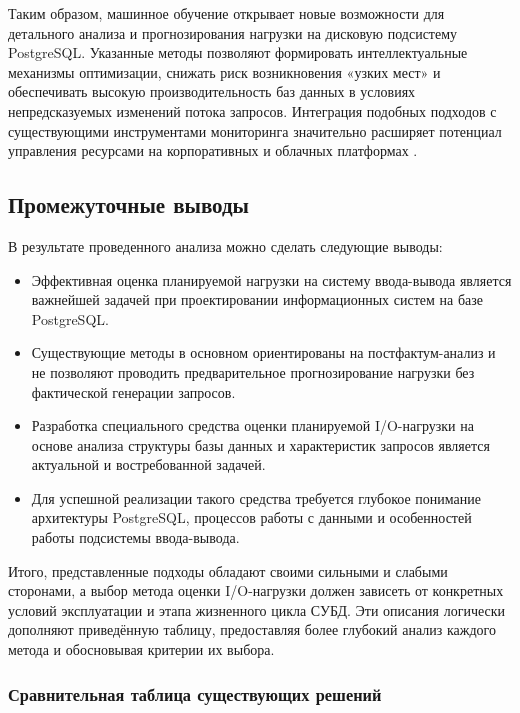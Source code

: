 Таким образом, машинное обучение открывает новые возможности для детального анализа и прогнозирования нагрузки на дисковую подсистему PostgreSQL. 
Указанные методы позволяют формировать интеллектуальные механизмы оптимизации, 
снижать риск возникновения «узких мест» и обеспечивать высокую производительность баз данных в условиях непредсказуемых изменений 
потока запросов. Интеграция подобных подходов с существующими инструментами мониторинга значительно расширяет потенциал управления 
ресурсами на корпоративных и облачных платформах \cite{sun2023predictive, ozkaya2020deep}.


\subsection{Промежуточные выводы}

В результате проведенного анализа можно сделать следующие выводы:

\begin{itemize}
    \item Эффективная оценка планируемой нагрузки на систему ввода-вывода является важнейшей задачей при проектировании информационных систем на базе PostgreSQL.
    \item Существующие методы в основном ориентированы на постфактум-анализ и не позволяют проводить предварительное прогнозирование нагрузки без фактической генерации запросов.
    \item Разработка специального средства оценки планируемой I/O-нагрузки на основе анализа структуры базы данных и характеристик запросов является актуальной и востребованной задачей.
    \item Для успешной реализации такого средства требуется глубокое понимание архитектуры PostgreSQL, процессов работы с данными и особенностей работы подсистемы ввода-вывода.
\end{itemize}

Итого, представленные подходы обладают своими сильными и слабыми сторонами, а выбор метода оценки I/O-нагрузки должен зависеть 
от конкретных условий эксплуатации и этапа жизненного цикла СУБД. Эти описания логически дополняют приведённую таблицу, 
предоставляя более глубокий анализ каждого метода и обосновывая критерии их выбора.


\subsubsection{Сравнительная таблица существующих решений}

